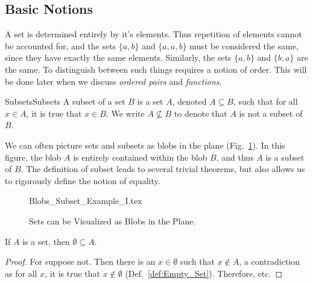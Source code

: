 \documentclass[crop=false,class=book,oneside]{standalone}
\begin{document}
        \subsection{Basic Notions}
            A set is determined entirely by it's elements.
            Thus repetition of elements cannot be accounted for,
            and the sets $\{a,b\}$ and $\{a,a,b\}$ must be
            considered the same, since they have exactly
            the same elements. Similarly, the sets $\{a,b\}$
            and $\{b,a\}$ are the same. To distinguish between
            such things requires a notion of order. This will
            be done later when we discuss \textit{ordered pairs}
            and \textit{functions}.
            \begin{ldefinition}{Subsets}{Subsets}
                A \gls{subset} of a set $B$ is a set $A$, denoted
                $A\subseteq{B}$, such that for all $x\in{A}$,
                it is true that $x\in{B}$. We write
                $A\nsubseteq{B}$ to denote that $A$ is not
                a subset of $B$.
            \end{ldefinition}
            We can often picture sets and subsets as blobs in
            the plane (Fig.~\ref{fig:Subset_Blobs}). In this
            figure, the blob $A$ is entirely contained within
            the blob $B$, and thus $A$ is a subset of $B$. The
            definition of subset leads to several trivial
            theorems, but also allows us to rigorously define
            the notion of equality.
            \begin{figure}[H]
                \centering
                
                    {Blobs_Subset_Example_I.tex}
                \caption[Visual for Subsets]
                    {Sets can be Visualized as Blobs
                     in the Plane.}
                \label{fig:Subset_Blobs}
            \end{figure}
            \begin{theorem}
                \label{thm:Emptyset_Is_Subset}%
                If $A$ is a set, then $\emptyset\subseteq{A}$.
            \end{theorem}
            \begin{proof}
                For suppose not. Then there is an $x\in\emptyset$
                such that $x\notin{A}$, a contradiction as
                for all $x$, it is true that $x\notin\emptyset$
                (Def.~\ref{def:Empty_Set}). Therefore, etc.
            \end{proof}
\end{document}
